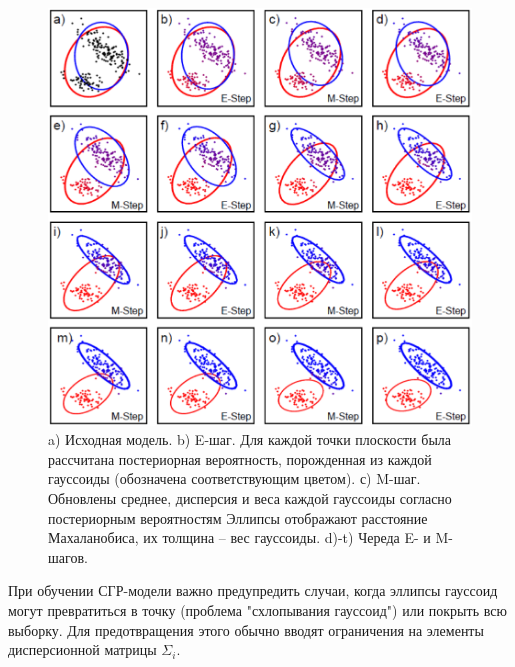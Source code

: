 \begin{figure}[h!]
\centering
\includegraphics[scale=0.4]{res/pic011}
\caption{a) Исходная модель. b) E-шаг. Для каждой точки плоскости была рассчитана постериорная вероятность, порожденная из каждой гауссоиды (обозначена соответствующим цветом). с) M-шаг. Обновлены среднее, дисперсия и веса каждой гауссоиды согласно постериорным вероятностям Эллипсы отображают расстояние Махаланобиса, их толщина -- вес гауссоиды. d)-t) Череда E- и M-шагов.}
\end{figure}

При обучении СГР-модели важно предупредить случаи, когда эллипсы гауссоид могут превратиться в точку (проблема "схлопывания гауссоид") или покрыть всю выборку. Для предотвращения этого обычно вводят ограничения на элементы дисперсионной матрицы $\Sigma_i$.